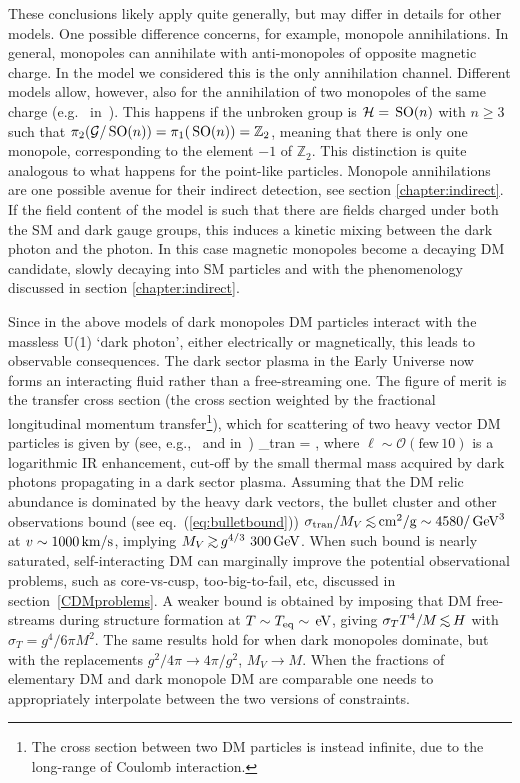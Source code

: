 These conclusions likely apply quite generally, but may differ in details for other models. 
One possible difference concerns, for example, monopole annihilations. 
In general, monopoles can annihilate with anti-monopoles of opposite magnetic charge.
In the model we considered this is the only annihilation channel.
Different models allow, however, also for the annihilation of two monopoles of the same charge (e.g.~ in~\cite{DarkMonopoles}).
This happens if the unbroken group is $\mathcal{H}=\,{\rm SO}(n)$ with $n\geq 3$ 
such that  $\pi_2(\mathcal{G}/\,{\rm SO}(n))=\pi_1(\,{\rm SO}(n))=\mathbb{Z}_2$,
meaning that there is only one monopole, corresponding to the element $-1$ of $\mathbb{Z}_2$.
This distinction is quite analogous to what happens for the point-like particles.
Monopole annihilations are one possible avenue for their indirect detection, see section \ref{chapter:indirect}. 
If the field content of the model is such that there are fields charged under both the SM and dark gauge groups, this induces a kinetic mixing between the dark photon and the photon. In this case magnetic monopoles become a decaying DM candidate, slowly decaying into SM particles and with the phenomenology discussed in section \ref{chapter:indirect}. 

\medskip


Since in the above models of dark monopoles  DM particles interact with the massless U(1)
`dark photon', either electrically or magnetically, this leads to observable consequences.
The dark sector plasma in the Early Universe now forms an interacting fluid rather than a free-streaming one. 
The figure of merit is the transfer cross section 
(the cross section weighted by the fractional longitudinal momentum transfer\footnote{The cross section between two DM particles is instead infinite, due to the long-range of Coulomb interaction.}),
which for scattering of two heavy vector DM particles is given by (see, e.g.,\  and
 in~\cite{SIDMotherbounds})
\beq 
\label{eq:sigmatran}
\sigma_{\rm tran} = \ell,
\eeq
where $\ell \sim{\mathcal O}(\text{few}\,10)$ is a logarithmic IR enhancement, 
cut-off by the small thermal mass
acquired by dark photons propagating in a dark sector plasma. 
Assuming that the DM relic abundance is dominated by the heavy dark vectors, the bullet cluster and other observations bound (see eq.~(\ref{eq:bulletbound}))
$\sigma_{\rm tran}/M_V \circa{<} {\rm cm^2/g} \sim 4580/\GeV^3$ at $v \sim 1000\,{\rm km/s}$,
implying $M_V \circa{>} g^{4/3} \ 300\GeV$.
When such bound is nearly saturated, self-interacting
DM  can marginally improve the potential observational problems, such as 
core-vs-cusp, too-big-to-fail, etc, discussed in section~\ref{CDMproblems}.
A weaker bound is obtained by imposing that DM free-streams during structure formation at $T \sim T_{\rm eq}\sim\,{\rm eV}$, giving
$\sigma_T T^4/M \circa{<} H$ with $\sigma_T =g^4/6\pi M^2$. The same results hold for when dark monopoles dominate, but with the replacements $g^2/4\pi \to 4\pi/g^2$, $M_V\to M$.
When the fractions of elementary DM and dark monopole DM are comparable 
one needs to appropriately interpolate between the two versions of constraints. 

